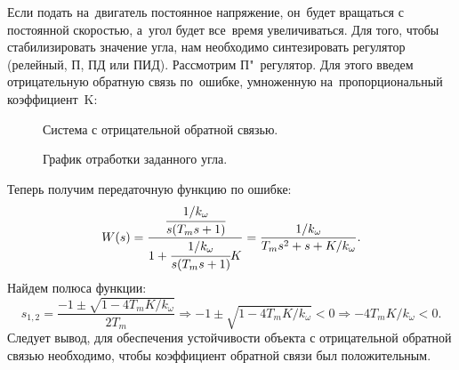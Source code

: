 \documentclass[12pt,a4paper,openany]{extarticle}
\begin{document}
Если подать на~двигатель постоянное напряжение, он~будет вращаться с постоянной скоростью, а~угол будет все~время увеличиваться.  Для того, чтобы стабилизировать значение угла, нам необходимо синтезировать регулятор (релейный, П, ПД или ПИД). Рассмотрим П"~регулятор. Для этого введем отрицательную обратную связь по~ошибке, умноженную на~пропорциональный коэффициент~K:

\begin{figure}[H]
	\noindent{}
	\caption{Система с отрицательной обратной связью.}
	\label{fig2}
\end{figure}

\begin{figure}[H]
	\noindent{}
	\caption{График отработки заданного угла.}
	\label{fig3}
\end{figure}

Теперь получим передаточную функцию по ошибке:
\begin{equation}
W(s)=\frac{\cfrac{1/k_\omega}{s(T_ms+1)}}{1+\cfrac{1/k_\omega}{s(T_ms+1)}K}=\frac{1/k_\omega}{T_ms^2+s+K/k_\omega}.
\end{equation}
Найдем полюса функции: 
\begin{equation}
s_{1,2}=\frac{-1\pm\sqrt{1-4T_mK/k_\omega}}{2T_m}\Rightarrow -1\pm\sqrt{1-4T_mK/k_\omega}<0\Rightarrow -4T_mK/k_\omega <0.
\end{equation}
Следует вывод, для обеспечения устойчивости объекта с отрицательной обратной связью необходимо, чтобы коэффициент обратной связи был положительным. \\ 
\end{document}
